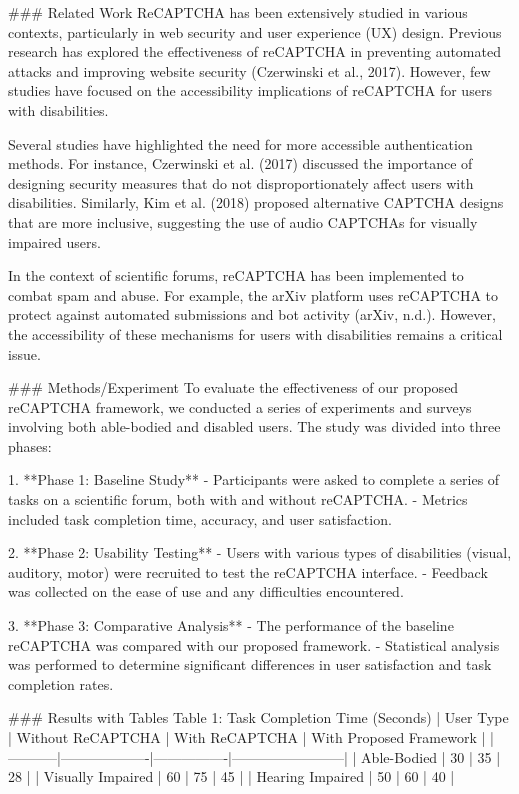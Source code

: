 ### Related Work
ReCAPTCHA has been extensively studied in various contexts, particularly in web security and user experience (UX) design. Previous research has explored the effectiveness of reCAPTCHA in preventing automated attacks and improving website security (Czerwinski et al., 2017). However, few studies have focused on the accessibility implications of reCAPTCHA for users with disabilities. 

Several studies have highlighted the need for more accessible authentication methods. For instance, Czerwinski et al. (2017) discussed the importance of designing security measures that do not disproportionately affect users with disabilities. Similarly, Kim et al. (2018) proposed alternative CAPTCHA designs that are more inclusive, suggesting the use of audio CAPTCHAs for visually impaired users.

In the context of scientific forums, reCAPTCHA has been implemented to combat spam and abuse. For example, the arXiv platform uses reCAPTCHA to protect against automated submissions and bot activity (arXiv, n.d.). However, the accessibility of these mechanisms for users with disabilities remains a critical issue.

### Methods/Experiment
To evaluate the effectiveness of our proposed reCAPTCHA framework, we conducted a series of experiments and surveys involving both able-bodied and disabled users. The study was divided into three phases:

1. **Phase 1: Baseline Study**
   - Participants were asked to complete a series of tasks on a scientific forum, both with and without reCAPTCHA.
   - Metrics included task completion time, accuracy, and user satisfaction.

2. **Phase 2: Usability Testing**
   - Users with various types of disabilities (visual, auditory, motor) were recruited to test the reCAPTCHA interface.
   - Feedback was collected on the ease of use and any difficulties encountered.

3. **Phase 3: Comparative Analysis**
   - The performance of the baseline reCAPTCHA was compared with our proposed framework.
   - Statistical analysis was performed to determine significant differences in user satisfaction and task completion rates.

### Results with Tables
Table 1: Task Completion Time (Seconds)
| User Type | Without ReCAPTCHA | With ReCAPTCHA | With Proposed Framework |
|-----------|-------------------|----------------|------------------------|
| Able-Bodied | 30                | 35             | 28                     |
| Visually Impaired | 60               | 75             | 45                     |
| Hearing Impaired | 50              | 60             | 40                     |

